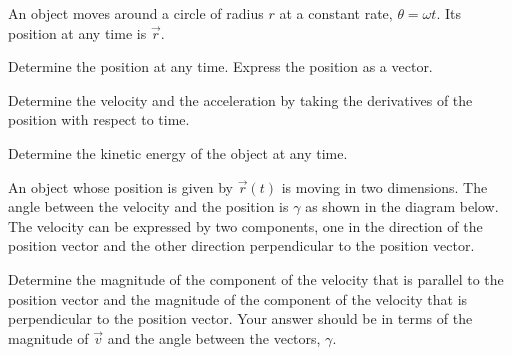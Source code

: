 \begin{problem}
\item An object moves around a circle of radius $r$  at a constant
  rate, $\theta=\omega t$. Its position at any time is $\vec{r}$.

  \begin{subproblem}
  \item Determine the position at any time. Express the position as
    a vector.
    \vfill
  \item Determine the velocity and the acceleration by taking the
    derivatives of the position with respect to time.
    \vfill
  \item Determine the kinetic energy of the object at any time.
    \vfill
  \end{subproblem}

  \clearpage

\item An object whose position is given by $\vec{r}(t)$ is moving in
  two dimensions. The angle between the velocity and the position is
  $\gamma$ as shown in the diagram below. The velocity can be
  expressed by two components, one in the direction of the position
  vector and the other direction
  perpendicular to the position vector. \\

  \begin{subproblem}
  \item Determine the magnitude of the component of the velocity that
    is parallel to the position vector and the magnitude of the
    component of the velocity that is perpendicular to the position
    vector. Your answer should be in terms of the magnitude of
    $\vec{v}$ and the angle between the vectors, $\gamma$.


\end{subproblem}
\end{problem}
